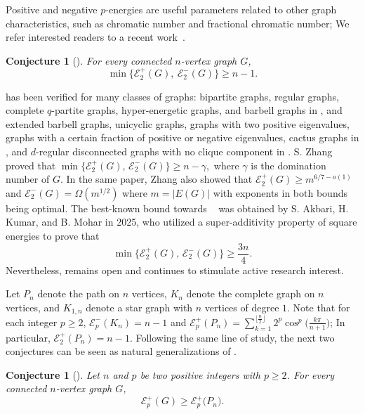 \documentclass[a4paper,12pt]{article}
\theoremstyle{plain}
\newtheorem{conjecture}[thm]{Conjecture}
\begin{document}
Positive and negative $p$-energies are useful parameters related to other graph characteristics, such as chromatic number and fractional chromatic number; We refer interested readers to a recent work~\cite{ELPHICK2026104252}. 


\begin{conjecture}[\cite{elphick2016conjectured}]\label{conj p=2}
For every connected $n$-vertex graph $G$, $$\min\{\mathcal{E}_2^+({G}), ~\mathcal{E}_2^-({G})\} \geq n - 1.$$
\end{conjecture}

 has been verified for many classes of graphs: bipartite graphs, regular graphs, complete $q$-partite graphs, hyper-energetic graphs, and barbell graphs in \cite{elphick2016conjectured}, and extended barbell graphs, unicyclic graphs, graphs with two positive eigenvalues, graphs with a certain fraction of positive or negative eigenvalues, cactus graphs in \cite{Abiad2023}, and $d$-regular disconnected graphs with no clique component in \cite{Elphick2024}. S. Zhang~\cite{Zhang2024} proved that 
$\min\{\mathcal{E}^+_2(G),\, \mathcal{E}^-_2(G)\} \ge n-\gamma,$ where $\gamma$ is the domination number of $G$. In the same paper, Zhang also showed that $
\mathcal{E}^{+}_2(G) \ge m^{6/7 - o(1)}$ and $\mathcal{E}^{-}_2(G) = \Omega(m^{1/2})$ where $m=|E(G)|$ with exponents in both bounds being optimal. The best-known bound towards ~ was obtained by S. Akbari, H. Kumar, and B. Mohar \cite{akbari2025linear} in 2025, who utilized a super-additivity property of square energies to prove that $$\min\{\mathcal{E}^{+}_2(G), \, \mathcal{E}^{-}_2(G)\} \ge \frac{3n}{4}.$$ Nevertheless,  remains open and continues to stimulate active research interest.

Let $P_n$ denote the path on $n$ vertices,  $K_n$ denote the complete graph on $n$ vertices, and $K_{1,n}$ denote a star graph with $n$ vertices of degree $1$. 
Note that for each integer $p\geq 2$, $\mathcal{E}_p^-(K_n)=n-1$ and $\mathcal{E}_p^+(P_n)=\sum\limits_{k=1}^{\lfloor\frac{n}{2}\rfloor} 2^p\cos^{p}\!\Big(\frac{k\pi}{n+1}\Big)$; In particular, $\mathcal{E}_2^+(P_n)=n-1$. 
Following the same line of study, the next two conjectures can be seen as natural generalizations of .

\begin{conjecture}[\cite{TLW2025}]\label{conj:positive}
Let $n$ and $p$ be two positive integers with $p\geq 2$. For every connected $n$-vertex graph $G$, $$\mathcal{E}^+_p({G}) \geq \mathcal{E}^+_p({P_{n})}.$$
\end{conjecture}
\end{document}
